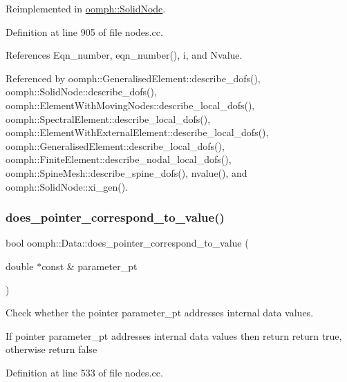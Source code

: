 Reimplemented in \hyperlink{classoomph_1_1SolidNode_a93ba15b4ab3ccd1d0030179878df4330}{oomph\+::\+Solid\+Node}.



Definition at line 905 of file nodes.\+cc.



References Eqn\+\_\+number, eqn\+\_\+number(), i, and Nvalue.



Referenced by oomph\+::\+Generalised\+Element\+::describe\+\_\+dofs(), oomph\+::\+Solid\+Node\+::describe\+\_\+dofs(), oomph\+::\+Element\+With\+Moving\+Nodes\+::describe\+\_\+local\+\_\+dofs(), oomph\+::\+Spectral\+Element\+::describe\+\_\+local\+\_\+dofs(), oomph\+::\+Element\+With\+External\+Element\+::describe\+\_\+local\+\_\+dofs(), oomph\+::\+Generalised\+Element\+::describe\+\_\+local\+\_\+dofs(), oomph\+::\+Finite\+Element\+::describe\+\_\+nodal\+\_\+local\+\_\+dofs(), oomph\+::\+Spine\+Mesh\+::describe\+\_\+spine\+\_\+dofs(), nvalue(), and oomph\+::\+Solid\+Node\+::xi\+\_\+gen().

\mbox{\label{classoomph_1_1Data_a1f001b88764d62579e0ed8d53f9d359f}} 
\subsubsection{\texorpdfstring{does\+\_\+pointer\+\_\+correspond\+\_\+to\+\_\+value()}{does\_pointer\_correspond\_to\_value()}}
{\footnotesize\ttfamily bool oomph\+::\+Data\+::does\+\_\+pointer\+\_\+correspond\+\_\+to\+\_\+value (\begin{DoxyParamCaption}\item[{double $\ast$const \&}]{parameter\+\_\+pt }\end{DoxyParamCaption})}



Check whether the pointer parameter\+\_\+pt addresses internal data values. 

If pointer parameter\+\_\+pt addresses internal data values then return return true, otherwise return false 

Definition at line 533 of file nodes.\+cc.



